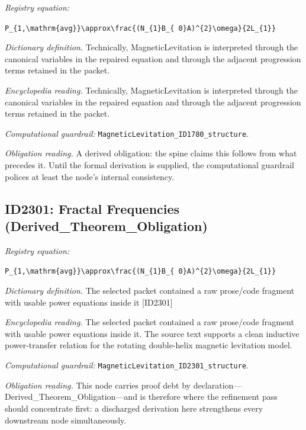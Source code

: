 \documentclass[11pt]{article}
\theoremstyle{remark}
\begin{document}
\noindent\textit{Registry equation:}\par
{\small\texttt{P\_\{1,\textbackslash{}mathrm\{avg\}\}\textbackslash{}approx\textbackslash{}frac\{(N\_\{1\}B\_\{ 0\}A)\textasciicircum{}\{2\}\textbackslash{}omega\}\{2L\_\{1\}\}}}\par\medskip
\noindent\textit{Dictionary definition.} Technically, MagneticLevitation is interpreted through the canonical variables in the repaired equation and through the adjacent progression terms retained in the packet.\par\medskip
\noindent\textit{Encyclopedia reading.} Technically, MagneticLevitation is interpreted through the canonical variables in the repaired equation and through the adjacent progression terms retained in the packet.
\par\medskip\noindent\textit{Computational guardrail:} \texttt{MagneticLevitation\_ID1780\_structure}.
\par\medskip\noindent\textit{Obligation reading.} A derived obligation: the spine claims this follows from what precedes it. Until the formal derivation is supplied, the computational guardrail polices at least the node's internal consistency.

\subsection{ID2301: Fractal Frequencies (Derived\_Theorem\_Obligation)}

\noindent\textit{Registry equation:}\par
{\small\texttt{P\_\{1,\textbackslash{}mathrm\{avg\}\}\textbackslash{}approx\textbackslash{}frac\{(N\_\{1\}B\_\{ 0\}A)\textasciicircum{}\{2\}\textbackslash{}omega\}\{2L\_\{1\}\}}}\par\medskip
\noindent\textit{Dictionary definition.} The selected packet contained a raw prose/code fragment with usable power equations inside it [ID2301]\par\medskip
\noindent\textit{Encyclopedia reading.} The selected packet contained a raw prose/code fragment with usable power equations inside it. The source text supports a clean inductive power-transfer relation for the rotating double-helix magnetic levitation model.
\par\medskip\noindent\textit{Computational guardrail:} \texttt{MagneticLevitation\_ID2301\_structure}.
\par\medskip\noindent\textit{Obligation reading.} This node carries proof debt by declaration---Derived\_Theorem\_Obligation---and is therefore where the refinement pass should concentrate first: a discharged derivation here strengthens every downstream node simultaneously.
\end{document}
